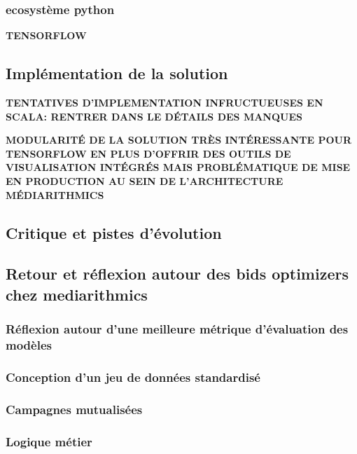         \subsubsection{ecosystème python}
            \textbf{TENSORFLOW}
    \subsection{Implémentation de la solution}
        \textbf{TENTATIVES D'IMPLEMENTATION INFRUCTUEUSES EN SCALA: RENTRER DANS LE DÉTAILS DES MANQUES} \par
        \textbf{MODULARITÉ DE LA SOLUTION TRÈS INTÉRESSANTE POUR TENSORFLOW EN PLUS D'OFFRIR DES OUTILS DE VISUALISATION INTÉGRÉS MAIS PROBLÉMATIQUE DE MISE EN PRODUCTION AU SEIN DE L'ARCHITECTURE MÉDIARITHMICS}
    \subsection{Critique et pistes d'évolution}

\subsection{Retour et réflexion autour des bids optimizers chez mediarithmics}
    \subsubsection{Réflexion autour d'une meilleure métrique d'évaluation des modèles}
    \subsubsection{Conception d'un jeu de données standardisé}
    \subsubsection{Campagnes mutualisées}
    \subsubsection{Logique métier}

